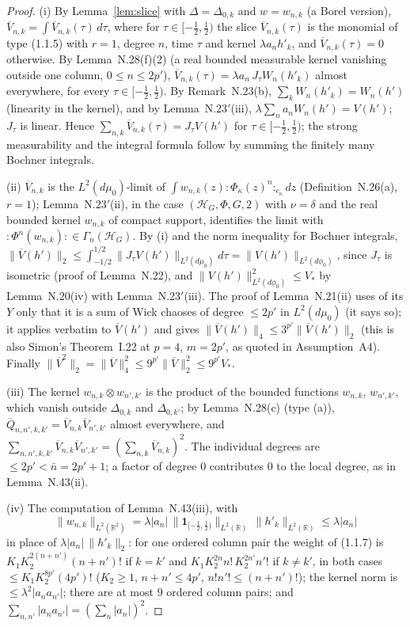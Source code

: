 \documentclass[11pt,a4paper]{article}
\newcommand{\R}{\mathbb{R}}
\newcommand{\HH}{\mathcal{H}}
\newcommand{\dmu}{d\mu_0}
\newcommand{\dphi}{d\phi_0}
\newcommand{\Vb}{\overline V}                 %
\theoremstyle{plain}
\theoremstyle{definition}
\begin{document}
\begin{proof}
(i) By Lemma~\ref{lem:slice} with $\Delta=\Delta_{0,k}$ and $w=w_{n,k}$ (a Borel version),
$\Vb_{n,k}=\int\Vb_{n,k}(\tau)\,d\tau$, where for $\tau\in[-\frac12,\frac12)$ the slice
$\Vb_{n,k}(\tau)$ is the monomial of type (1.1.5) with $r=1$, degree $n$, time $\tau$ and
kernel $\lambda a_nh'_k$, and $\Vb_{n,k}(\tau)=0$ otherwise.  By Lemma~N.28(f)(2) (a real
bounded measurable kernel vanishing outside one column, $0\le n\le2p'$),
$\Vb_{n,k}(\tau)=\lambda a_n\,J_\tau W_n(h'_k)$ almost everywhere, for every
$\tau\in[-\frac12,\frac12)$.  By Remark~N.23(b), $\sum_kW_n(h'_k)=W_n(h')$ (linearity in the
kernel), and by Lemma~N.23$'$(iii), $\lambda\sum_na_nW_n(h')=V(h')$; $J_\tau$ is linear.  Hence
$\sum_{n,k}\Vb_{n,k}(\tau)=J_\tau V(h')$ for $\tau\in[-\frac12,\frac12)$; the strong
measurability and the integral formula follow by summing the finitely many Bochner integrals.

(ii) $\Vb_{n,k}$ is the $L^2(\dmu)$-limit of $\int w_{n,k}(z){:}\Phi_\kappa(z)^n{:}_{c_\kappa}dz$
(Definition~N.26(a), $r=1$); Lemma~N.23$'$(ii), in the case $(\HH_G,\Phi,G,2)$ with $\nu=\delta$
and the real bounded kernel $w_{n,k}$ of compact support, identifies the limit with
${:}\Phi^n(w_{n,k}){:}\in\Gamma_n(\HH_G)$.  By (i) and the norm inequality for Bochner integrals,
$\|\Vb(h')\|_2\le\int_{-1/2}^{1/2}\|J_\tau V(h')\|_{L^2(\dmu)}d\tau=\|V(h')\|_{L^2(\dphi)}$, since
$J_\tau$ is isometric (proof of Lemma~N.22), and $\|V(h')\|^2_{L^2(\dphi)}\le V_*$ by
Lemma~N.20(iv) with Lemma~N.23$'$(iii).  The proof of Lemma~N.21(ii) uses of its $Y$ only that
it is a sum of Wick chaoses of degree $\le2p'$ in $L^2(\dmu)$ (it says so); it applies verbatim
to $\Vb(h')$ and gives $\|\Vb(h')\|_4\le3^{p'}\|\Vb(h')\|_2$ (this is also Simon's
Theorem~I.22 at $p=4$, $m=2p'$, as quoted in Assumption~A4).  Finally
$\|\Vb^2\|_2=\|\Vb\|_4^2\le9^{p'}\|\Vb\|_2^2\le9^{p'}V_*$.

(iii) The kernel $w_{n,k}\otimes w_{n',k'}$ is the product of the bounded functions
$w_{n,k}$, $w_{n',k'}$, which vanish outside $\Delta_{0,k}$ and $\Delta_{0,k'}$; by
Lemma~N.28(c) (type (a)), $\overline Q_{n,n',k,k'}=\Vb_{n,k}\Vb_{n',k'}$ almost everywhere, and
$\sum_{n,n',k,k'}\Vb_{n,k}\Vb_{n',k'}=(\sum_{n,k}\Vb_{n,k})^2$.  The individual degrees are
$\le2p'<\bar n=2p'+1$; a factor of degree $0$ contributes $0$ to the local degree, as in
Lemma~N.43(ii).

(iv) The computation of Lemma~N.43(iii), with
\[
 \|w_{n,k}\|_{L^2(\R^2)}=\lambda|a_n|\,\|\mathbf 1_{[-\frac12,\frac12)}\|_{L^2(\R)}\,
 \|h'_k\|_{L^2(\R)}\le\lambda|a_n|
\]
in place of $\lambda|a_n|\,\|h'_k\|_2$: for one ordered column pair the weight of (1.1.7) is
$K_1K_2^{2(n+n')}(n+n')!$ if $k=k'$ and $K_1K_2^{2n}n!\,K_2^{2n'}n'!$ if $k\ne k'$, in both cases
$\le K_1K_2^{8p'}(4p')!$ ($K_2\ge1$, $n+n'\le4p'$, $n!n'!\le(n+n')!$); the kernel norm is
$\le\lambda^2|a_na_{n'}|$; there are at most $9$ ordered column pairs; and
$\sum_{n,n'}|a_na_{n'}|=(\sum_n|a_n|)^2$.
\end{proof}
\end{document}
